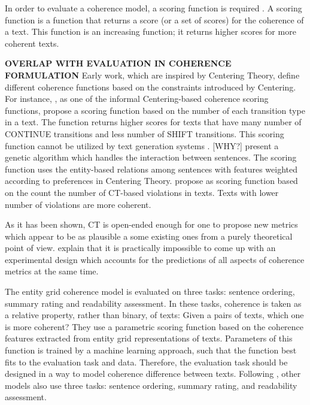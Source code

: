 In order to evaluate a coherence model, a scoring function is required \cite{karamanis04}.   
A scoring function is a function that returns a score (or a set of scores) for the coherence of a text.  
This function is an increasing function; it returns higher scores for more coherent texts. 

\textbf{OVERLAP WITH EVALUATION IN COHERENCE FORMULATION}
Early work, which are inspired by Centering Theory, define different coherence functions based on the constraints introduced by Centering.    
For instance,  , as one of the informal Centering-based coherence scoring functions, propose a scoring function based on the number of each transition type in a text.  
The function returns higher scores for texts that have many number of CONTINUE transitions and less number of SHIFT transitions. 
This scoring function cannot be utilized by text generation systems \cite{karamanis04}. [WHY?] 
 present a genetic algorithm which handles the interaction between sentences.  
The scoring function uses the entity-based relations among sentences with features weighted according to preferences in Centering Theory.  
 propose as scoring function based on the count the number of CT-based violations in texts. Texts with lower number of violations are more coherent. 

As it has been shown, CT is open-ended enough for one to propose new metrics which appear to be as plausible a some existing ones from a purely theoretical point of view. 
 explain that it is practically impossible to come up with an experimental design which accounts for the predictions of all aspects of coherence metrics at the same time. 

The entity grid coherence model \cite{barzilay05a} is evaluated on three tasks: sentence ordering, summary rating and readability assessment. 
In these tasks, coherence is taken as a relative property, rather than binary, of texts: Given a pairs of texts, which one is more coherent? 
They use a parametric scoring function based on the coherence features extracted from entity grid representations of texts.
Parameters of this function is trained by a machine learning approach, such that the function best fits to the evaluation task and data. 
Therefore, the evaluation task should be designed in a way to model coherence difference between texts. 
Following \cite{barzilay05a}, other models \cite{} also use three tasks: sentence ordering, summary rating, and readability assessment. 



